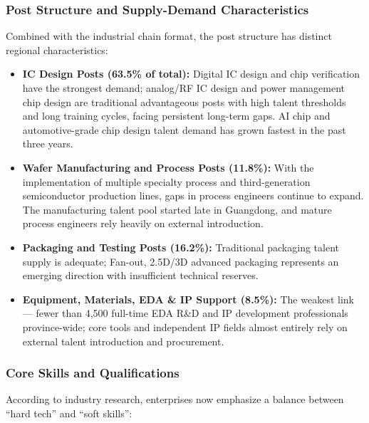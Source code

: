 \documentclass[12pt,a4paper]{article}
\begin{document}
\subsubsection{Post Structure and Supply-Demand Characteristics}

Combined with the industrial chain format, the post structure has distinct
regional characteristics:

\begin{itemize}
    \item \textbf{IC Design Posts (63.5\% of total):} Digital IC design and
          chip verification have the strongest demand; analog/RF IC design
          and power management chip design are traditional advantageous posts
          with high talent thresholds and long training cycles, facing
          persistent long-term gaps. AI chip and automotive-grade chip design
          talent demand has grown fastest in the past three years.
    \item \textbf{Wafer Manufacturing and Process Posts (11.8\%):} With the
          implementation of multiple specialty process and third-generation
          semiconductor production lines, gaps in process engineers continue
          to expand. The manufacturing talent pool started late in Guangdong,
          and mature process engineers rely heavily on external introduction.
    \item \textbf{Packaging and Testing Posts (16.2\%):} Traditional packaging
          talent supply is adequate; Fan-out, 2.5D/3D advanced packaging
          represents an emerging direction with insufficient technical reserves.
    \item \textbf{Equipment, Materials, EDA \& IP Support (8.5\%):} The weakest
          link — fewer than 4,500 full-time EDA R\&D and IP development
          professionals province-wide; core tools and independent IP fields
          almost entirely rely on external talent introduction and procurement.
\end{itemize}

\subsubsection{Core Skills and Qualifications}

According to industry research, enterprises now emphasize a balance between
``hard tech'' and ``soft skills'':
\end{document}
